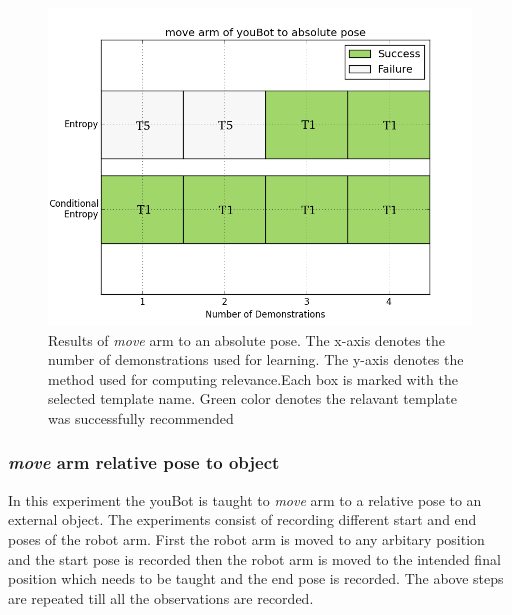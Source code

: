 \begin{figure}[htp]
\centering
\includegraphics[scale=0.5]{images/arm_absolute_result.png}
\caption[Result : \textit{move} arm absolute pose]{Results of \textit{ move} arm to an absolute pose. The x-axis denotes the 
number of demonstrations used for learning. The y-axis denotes the method used for 
computing relevance.Each
box is marked with the selected template name. Green color denotes the relavant template was successfully recommended}
\label{arm absolute result}
\end{figure}


\FloatBarrier
\subsubsection{\textit{move} arm relative pose to object}
In this experiment the youBot is
taught to \textit{move} arm to a relative pose to an external object.
The experiments consist of recording different start and end poses of the robot arm. 
First the robot arm is moved to any arbitary position and the start pose is recorded then 
the robot arm is moved to the intended final position which needs to be taught and the end 
pose is recorded. The above steps are repeated till all the observations are recorded.


